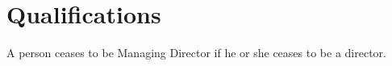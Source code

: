 \section{Qualifications}

A person ceases to be Managing Director if he or she ceases to be a director. 
